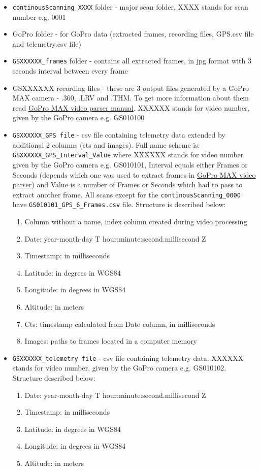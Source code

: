 \documentclass[a4paper,12pt]{book}
\begin{document}
\begin{itemize}
	\item \verb|continousScanning_XXXX| folder - major scan folder, XXXX stands for scan number e.g. 0001
	\item GoPro folder - for GoPro data (extracted frames, recording files, GPS.csv file and telemetry.csv file)
	\item \verb|GSXXXXXX_frames| folder - contains all extracted frames, in jpg format with 3 seconds interval between every frame
	\item GSXXXXXX recording files - these are 3 output files generated by a GoPro MAX camera - .360, .LRV and .THM. To get more information about them read \href{https://github.com/miloszwojciechowski/Warsaw-model/tree/main/Manuals/GoPro_MAX_video_parser}{GoPro MAX video parser manual}. XXXXXX stands for video number, given by the GoPro camera e.g. GS010100
	\item \verb|GSXXXXXX_GPS file| - csv file containing telemetry data extended by additional 2 columns (cts and images). Full name scheme is: \verb|GSXXXXXX_GPS_Interval_Value| where  XXXXXX stands for video number given by the GoPro camera e.g. GS010101, Interval equals either Frames or Seconds (depends which one was used to extract frames in \href{https://github.com/miloszwojciechowski/Warsaw-model/tree/main/GoPro_MAX_video_parser}{GoPro MAX video parser}) and Value is a number of Frames or Seconds which had to pass to extract another frame. All scans except for the \verb|continousScanning_0000| have \verb|GS010101_GPS_6_Frames.csv| file. Structure is described below:
	\begin{enumerate}
		\item Column without a name, index column created during video processing
		\item Date: year-month-day T hour:minute:second.millisecond Z
		\item Timestamp: in milliseconds
		\item Latitude: in degrees in WGS84
		\item Longitude: in degrees in WGS84
		\item Altitude: in meters
		\item Cts: timestamp calculated from Date column, in milliseconds
		\item Images: paths to frames located in a computer memory
	\end{enumerate}
	\item \verb|GSXXXXXX_telemetry file| - csv file containing telemetry data.  XXXXXX stands for video number, given by the GoPro camera e.g. GS010102. Structure described below:
	\begin{enumerate}
		\item Date: year-month-day T hour:minute:second.millisecond Z
		\item Timestamp: in milliseconds
		\item Latitude: in degrees in WGS84
		\item Longitude: in degrees in WGS84
		\item Altitude: in meters
	\end{enumerate}
\end{itemize}
\end{document}
